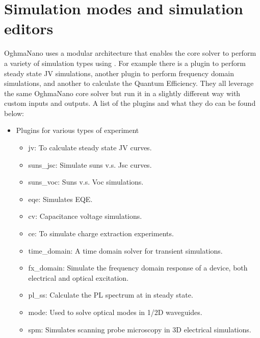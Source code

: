 \chapter{Simulation modes and simulation editors}
\label{sec:simmodes}

OghmaNano uses a modular architecture that enables the core solver to perform a variety of simulation types using . For example there is a plugin to perform steady state JV simulations, another plugin to perform frequency domain simulations, and another to calculate the Quantum Efficiency. They all leverage the same OghmaNano core solver but run it in a slightly different way with custom inputs and outputs. A list of the plugins and what they do can be found below:

\begin{itemize}
	\vspace{-0.2cm}\item Plugins for various types of experiment
	\begin{itemize}
		\vspace{-0.2cm}\item jv: To calculate steady state JV curves.
		\vspace{-0.2cm}\item suns\_jsc: Simulate suns v.s. Jsc curves.
		\vspace{-0.2cm}\item suns\_voc: Suns v.s. Voc simulations.
		\vspace{-0.2cm}\item eqe: Simulates EQE.
		\vspace{-0.2cm}\item cv: Capacitance voltage simulations.
		\vspace{-0.2cm}\item ce: To simulate charge extraction experiments.
		\vspace{-0.2cm}\item time\_domain: A time domain solver for transient simulations.
		\vspace{-0.2cm}\item fx\_domain: Simulate the frequency domain response of a device, both electrical and optical excitation.
		\vspace{-0.2cm}\item pl\_ss: Calculate the PL spectrum at in steady state.
		\vspace{-0.2cm}\item mode: Used to solve optical modes in 1/2D waveguides.
		\vspace{-0.2cm}\item spm: Simulates scanning probe microscopy in 3D electrical simulations.

\end{itemize}
\end{itemize}
